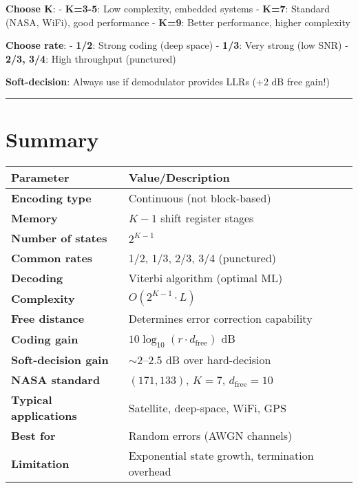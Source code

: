 \textbf{Choose K}: - \textbf{K=3-5}: Low complexity, embedded systems -
\textbf{K=7}: Standard (NASA, WiFi), good performance - \textbf{K=9}:
Better performance, higher complexity

\textbf{Choose rate}: - \textbf{1/2}: Strong coding (deep space) -
\textbf{1/3}: Very strong (low SNR) - \textbf{2/3, 3/4}: High throughput
(punctured)

\textbf{Soft-decision}: Always use if demodulator provides LLRs (+2 dB
free gain!)

\begin{center}\rule{0.5\linewidth}{0.5pt}\end{center}

\section{Summary}

\begin{center}
\begin{tabular}{@{}ll@{}}
\toprule
\textbf{Parameter} & \textbf{Value/Description} \\
\midrule
\textbf{Encoding type} & Continuous (not block-based) \\
\textbf{Memory} & $K-1$ shift register stages \\
\textbf{Number of states} & $2^{K-1}$ \\
\textbf{Common rates} & 1/2, 1/3, 2/3, 3/4 (punctured) \\
\textbf{Decoding} & Viterbi algorithm (optimal ML) \\
\textbf{Complexity} & $O(2^{K-1} \cdot L)$ \\
\textbf{Free distance} & Determines error correction capability \\
\textbf{Coding gain} & $10\log_{10}(r \cdot d_{\text{free}})$ dB \\
\textbf{Soft-decision gain} & $\sim$2--2.5 dB over hard-decision \\
\textbf{NASA standard} & $(171, 133)$, $K=7$, $d_{\text{free}}=10$ \\
\textbf{Typical applications} & Satellite, deep-space, WiFi, GPS \\
\textbf{Best for} & Random errors (AWGN channels) \\
\textbf{Limitation} & Exponential state growth, termination overhead \\
\bottomrule
\end{tabular}
\end{center}

